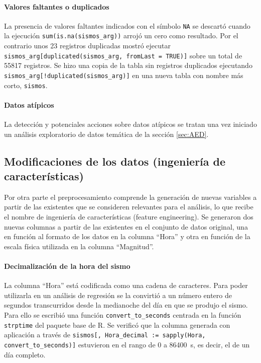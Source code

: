 \documentclass[a4paper]{report}
\begin{document}
\paragraph{Valores faltantes o duplicados}
La presencia de valores faltantes indicados con el símbolo \verb'NA' se descartó cuando la ejecución \verb'sum(is.na(sismos_arg))' arrojó un cero como resultado.
Por el contrario unos \num{23} registros duplicadas mostró
ejecutar \verb'sismos_arg[duplicated(sismos_arg, fromLast = TRUE)]' sobre un total de \num{55817} registros.
Se hizo una copia de la tabla sin registros duplicados ejecutando \verb'sismos_arg[!duplicated(sismos_arg)]' en una nueva tabla con nombre más corto, \verb'sismos'.


\paragraph{Datos atípicos}
La detección y potenciales acciones sobre datos atípicos se tratan una vez iniciado un análisis exploratorio de datos temática de la sección \ref{sec:AED}.\\


\subsection{Modificaciones de los datos (ingeniería de características)}

Por otra parte el preprocesamiento comprende la generación de nuevas variables a partir de las existentes que se consideren relevantes para el análisis, lo que recibe el nombre de ingeniería de características (feature engineering).
Se generaron dos nuevas columnas a partir de las existentes en el conjunto de datos original, una en función al formato de los datos en la columna ``Hora'' y otra en función de la escala física utilizada en la columna ``Magnitud''.


\paragraph{Decimalización de la hora del sismo}
La columna ``Hora'' está codificada como una cadena de caracteres.
Para poder utilizarla en un análisis de regresión se la convirtió a un número entero de segundos transcurridos desde la medianoche del día en que se produjo el sismo. 
Para ello se escribió una función \verb'convert_to_seconds' centrada en la función \verb'strptime' del paquete base de R.
Se verificó que la columna generada con aplicación a través de \verb'sismos[, Hora_decimal := sapply(Hora, convert_to_seconds)]' estuvieron en el rango de \num{0} a \SI{86400}{\second}, es decir, el de un día completo.
\end{document}
